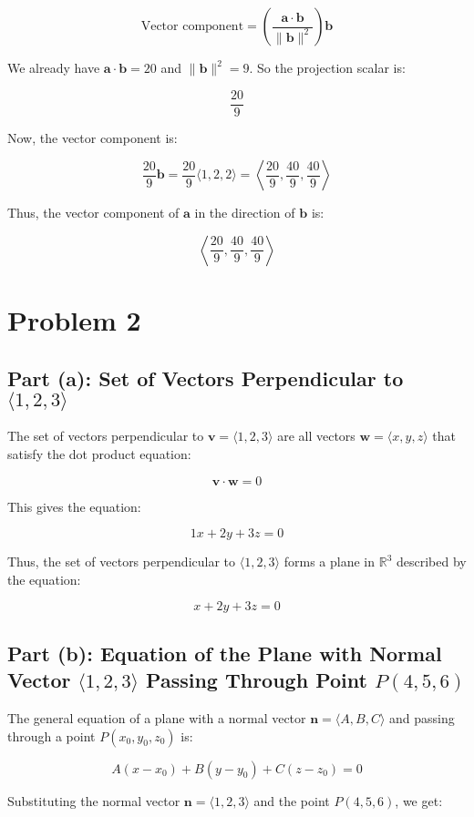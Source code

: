 \documentclass[11pt]{article}
\begin{document}
\[
\text{Vector component} = \left( \frac{\mathbf{a} \cdot \mathbf{b}}{\|\mathbf{b}\|^2} \right) \mathbf{b}
\]

We already have $\mathbf{a} \cdot \mathbf{b} = 20$ and $\|\mathbf{b}\|^2 = 9$. So the projection scalar is:

\[
\frac{20}{9}
\]

Now, the vector component is:

\[
\frac{20}{9} \mathbf{b} = \frac{20}{9} \langle 1, 2, 2 \rangle = \left\langle \frac{20}{9}, \frac{40}{9}, \frac{40}{9} \right\rangle
\]

Thus, the vector component of $\mathbf{a}$ in the direction of $\mathbf{b}$ is:

\[
\left\langle \frac{20}{9}, \frac{40}{9}, \frac{40}{9} \right\rangle
\]
\newpage

\section{Problem 2}
\subsection{Part (a): Set of Vectors Perpendicular to $\langle 1, 2, 3 \rangle$}

The set of vectors perpendicular to $\mathbf{v} = \langle 1, 2, 3 \rangle$ are all vectors $\mathbf{w} = \langle x, y, z \rangle$ that satisfy the dot product equation:

\[
\mathbf{v} \cdot \mathbf{w} = 0
\]

This gives the equation:

\[
1x + 2y + 3z = 0
\]

Thus, the set of vectors perpendicular to $\langle 1, 2, 3 \rangle$ forms a plane in $\mathbb{R}^3$ described by the equation:

\[
x + 2y + 3z = 0
\]

\newpage
\subsection{Part (b): Equation of the Plane with Normal Vector $\langle 1, 2, 3 \rangle$ Passing Through Point $P(4, 5, 6)$}

The general equation of a plane with a normal vector $\mathbf{n} = \langle A, B, C \rangle$ and passing through a point $P(x_0, y_0, z_0)$ is:

\[
A(x - x_0) + B(y - y_0) + C(z - z_0) = 0
\]

Substituting the normal vector $\mathbf{n} = \langle 1, 2, 3 \rangle$ and the point $P(4, 5, 6)$, we get:
\end{document}
